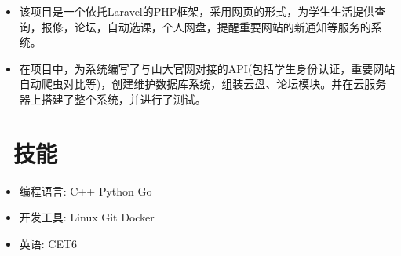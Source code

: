 \documentclass{resume}
\begin{document}


  \begin{itemize}[topsep = 0 pt, partopsep = 0pt]
    \item 该项目是一个依托Laravel的PHP框架，采用网页的形式，为学生生活提供查询，报修，论坛，自动选课，个人网盘，提醒重要网站的新通知等服务的系统。
    \item 在项目中，为系统编写了与山大官网对接的API(包括学生身份认证，重要网站自动爬虫对比等)，创建维护数据库系统，组装云盘、论坛模块。并在云服务器上搭建了整个系统，并进行了测试。
  \end{itemize}
  
  
  \section{\faCogs\ 技能}
  \begin{itemize}[parsep=0.5ex]
    \item 编程语言: C++ Python Go
    \item 开发工具: Linux Git Docker
    \item 英语: CET6
  \end{itemize}
  
\end{document}
